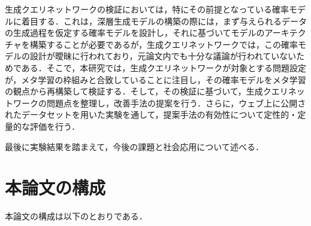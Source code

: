 生成クエリネットワークの検証においては，特にその前提となっている確率モデルに着目する．これは，深層生成モデルの構築の際には，まず与えられるデータの生成過程を仮定する確率モデルを設計し，それに基づいてモデルのアーキテクチャを構築することが必要であるが，生成クエリネットワークでは，この確率モデルの設計が曖昧に行われており，元論文内でも十分な議論が行われていないためである．そこで，本研究では，生成クエリネットワークが対象とする問題設定が，メタ学習の枠組みと合致していることに注目し，その確率モデルをメタ学習の観点から再構築して検証する．そして，その検証に基づいて，生成クエリネットワークの問題点を整理し，改善手法の提案を行う．さらに，ウェブ上に公開されたデータセットを用いた実験を通して，提案手法の有効性について定性的・定量的な評価を行う．

最後に実験結果を踏まえて，今後の課題と社会応用について述べる．
  
\section{本論文の構成}
本論文の構成は以下のとおりである．






